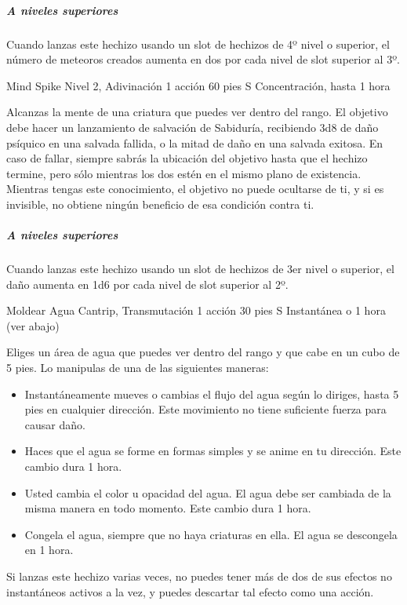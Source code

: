 \documentclass[a4paper,twocolumn,openany,10pt]{dndbook}
\begin{document}
	\subparagraph{A niveles superiores} Cuando lanzas este hechizo usando un slot de hechizos de 4º nivel o superior, el número
	de meteoros creados aumenta en dos por cada nivel de slot superior al 3º.

\spellheader%
	{Mind Spike}
	{Nivel 2, Adivinación}
	{1 acción}
	{60 pies}
	{S}
	{Concentración, hasta 1 hora}
	
	Alcanzas la mente de una criatura que puedes ver dentro del rango. El objetivo debe hacer un lanzamiento de salvación de
	Sabiduría, recibiendo 3d8 de daño psíquico en una salvada fallida, o la mitad de daño en una salvada exitosa. En caso de
	fallar, siempre sabrás la ubicación del objetivo hasta que el hechizo termine, pero sólo mientras los dos estén en el mismo
	plano de existencia. Mientras tengas este conocimiento, el objetivo no puede ocultarse de ti, y si es invisible, no obtiene
	ningún beneficio de esa condición contra ti.
	
	\subparagraph{A niveles superiores} Cuando lanzas este hechizo usando un slot de hechizos de 3er nivel o superior, el daño
	aumenta en 1d6 por cada nivel de slot superior al 2º. 

\spellheader%
	{Moldear Agua}
	{Cantrip, Transmutación}
	{1 acción}
	{30 pies}
	{S}
	{Instantánea o 1 hora (ver abajo)}
	
	Eliges un área de agua que puedes ver dentro del rango y que cabe en un cubo de 5 pies. Lo manipulas de una de las
	siguientes maneras:
	\begin{itemize}
		\item Instantáneamente mueves o cambias el flujo del agua según lo diriges, hasta 5 pies en cualquier dirección. Este
		movimiento no tiene suficiente fuerza para causar daño.
		
		\item Haces que el agua se forme en formas simples y se anime en tu dirección. Este cambio dura 1 hora.
		
		\item Usted cambia el color u opacidad del agua. El agua debe ser cambiada de la misma manera en todo momento. Este
		cambio dura 1 hora.
		
		\item Congela el agua, siempre que no haya criaturas en ella. El agua se descongela en 1 hora.
	\end{itemize}
	
	Si lanzas este hechizo varias veces, no puedes tener más de dos de sus efectos no instantáneos activos a la vez, y puedes
	descartar tal efecto como una acción.
\end{document}
